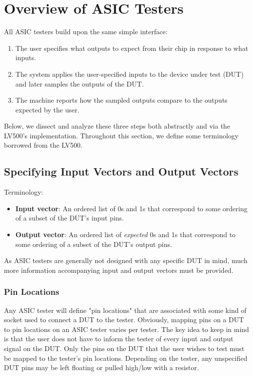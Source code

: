 \section{Overview of ASIC Testers}
All ASIC testers build upon the same simple interface: 
\begin{enumerate}
\item The user specifies what outputs to expect from their chip in response to what inputs.
\item The system applies the user-specified inputs to the device under test (DUT) and later samples the outputs of the DUT.
\item The machine reports how the sampled outputs compare to the outputs expected by the user.
\end{enumerate}

Below, we dissect and analyze these three steps both abstractly and via the LV500's implementation. Throughout this section, we define some terminology borrowed from the LV500. 

\subsection{Specifying Input Vectors and Output Vectors}
Terminology: 
\begin{itemize}
\item \textbf{Input vector}: An ordered list of 0s and 1s that correspond to some ordering of a subset of the DUT's input pins. 
\item \textbf{Output vector}: An ordered list of \textit{expected} 0s and 1s that correspond to some ordering of a subset of the DUT's output pins. 
\end{itemize}

As ASIC testers are generally not designed with any specific DUT in mind, much more information accompanying input and output vectors must be provided.

\subsubsection{Pin Locations}
Any ASIC tester will define "pin locations" that are associated with some kind of socket used to connect a DUT to the tester. Obviously, mapping pins on a DUT to pin locations on an ASIC tester varies per tester. The key idea to keep in mind is that the user does not have to inform the tester of every input and output signal on the DUT. Only the pins on the DUT that the user wishes to test must be mapped to the tester's pin locations. Depending on the tester, any unspecified DUT pins may be left floating or pulled high/low with a resistor.

